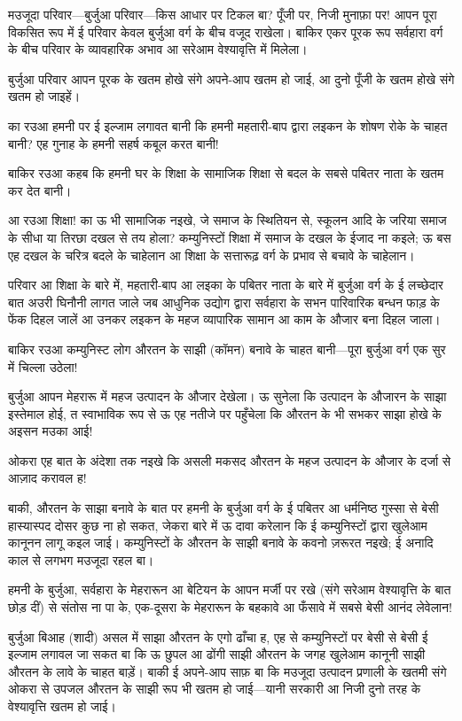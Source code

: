 \documentclass[12pt,a4paper,oneside]{book}
\begin{document}
मउजूदा परिवार—बुर्जुआ परिवार—किस आधार पर टिकल बा? पूँजी पर, निजी मुनाफ़ा पर! आपन पूरा विकसित रूप में ई परिवार केवल बुर्जुआ वर्ग के बीच वजूद राखेला। बाकिर एकर पूरक रूप सर्वहारा वर्ग के बीच परिवार के व्यावहारिक अभाव आ सरेआम वेश्यावृत्ति में मिलेला।

बुर्जुआ परिवार आपन पूरक के खतम होखे संगे अपने-आप खतम हो जाई, आ दुनो पूँजी के खतम होखे संगे खतम हो जाइहें।

का रउआ हमनी पर ई इल्जाम लगावत बानी कि हमनी महतारी-बाप द्वारा लइकन के शोषण रोके के चाहत बानी? एह गुनाह के हमनी सहर्ष कबूल करत बानी!

बाकिर रउआ कहब कि हमनी घर के शिक्षा के सामाजिक शिक्षा से बदल के सबसे पबितर नाता के खतम कर देत बानी।

आ रउआ शिक्षा! का ऊ भी सामाजिक नइखे, जे समाज के स्थितियन से, स्कूलन आदि के जरिया समाज के सीधा या तिरछा दखल से तय होला? कम्युनिस्टों शिक्षा में समाज के दखल के ईजाद ना कइले; ऊ बस एह दखल के चरित्र बदले के चाहेलान आ शिक्षा के सत्तारूढ़ वर्ग के प्रभाव से बचावे के चाहेलान।

परिवार आ शिक्षा के बारे में, महतारी-बाप आ लइका के पबितर नाता के बारे में बुर्जुआ वर्ग के ई लच्छेदार बात अउरी घिनौनी लागत जाले जब आधुनिक उद्योग द्वारा सर्वहारा के सभन पारिवारिक बन्धन फाड़ के फेंक दिहल जालें आ उनकर लइकन के महज व्यापारिक सामान आ काम के औजार बना दिहल जाला।

बाकिर रउआ कम्युनिस्ट लोग औरतन के साझी (कॉमन) बनावे के चाहत बानी—पूरा बुर्जुआ वर्ग एक सुर में चिल्ला उठेला!

बुर्जुआ आपन मेहरारू में महज उत्पादन के औजार देखेला। ऊ सुनेला कि उत्पादन के औजारन के साझा इस्तेमाल होई, त स्वाभाविक रूप से ऊ एह नतीजे पर पहुँचेला कि औरतन के भी सभकर साझा होखे के अइसन मउका आई!

ओकरा एह बात के अंदेशा तक नइखे कि असली मकसद औरतन के महज उत्पादन के औजार के दर्जा से आज़ाद करावल ह!

बाकी, औरतन के साझा बनावे के बात पर हमनी के बुर्जुआ वर्ग के ई पबितर आ धर्मनिष्ठ गुस्सा से बेसी हास्यास्पद दोसर कुछ ना हो सकत, जेकरा बारे में ऊ दावा करेलान कि ई कम्युनिस्टों द्वारा खुलेआम कानूनन लागू कइल जाई। कम्युनिस्टों के औरतन के साझी बनावे के कवनो ज़रूरत नइखे; ई अनादि काल से लगभग मउजूदा रहल बा।

हमनी के बुर्जुआ, सर्वहारा के मेहरारून आ बेटियन के आपन मर्जी पर रखे (संगे सरेआम वेश्यावृत्ति के बात छोड़ दीं) से संतोस ना पा के, एक-दूसरा के मेहरारून के बहकावे आ फँसावे में सबसे बेसी आनंद लेवेलान!

बुर्जुआ बिआह (शादी) असल में साझा औरतन के एगो ढाँचा ह, एह से कम्युनिस्टों पर बेसी से बेसी ई इल्जाम लगावल जा सकत बा कि ऊ छुपल आ ढोंगी साझी औरतन के जगह खुलेआम कानूनी साझी औरतन के लावे के चाहत बाड़ें। बाकी ई अपने-आप साफ़ बा कि मउजूदा उत्पादन प्रणाली के खतमी संगे ओकरा से उपजल औरतन के साझी रूप भी खतम हो जाई—यानी सरकारी आ निजी दुनो तरह के वेश्यावृत्ति खतम हो जाई।
\end{document}
